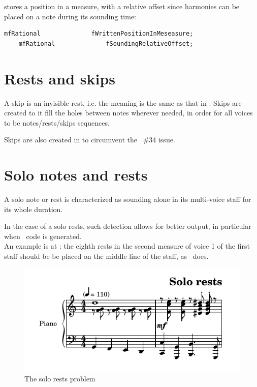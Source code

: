  stores a position in a measure, with a relative offset since harmonies can be placed on a note during its sounding time:
\begin{lstlisting}[language=CPlusPlus]
    mfRational              fWrittenPositionInMeseasure;
    mfRational              fSoundingRelativeOffset;
\end{lstlisting}


\section{Rests and skips}\label{Rests and skips}

A skip is an invisible rest, i.e. the meaning is the same as that in \lily. Skips are created to {it fill the holes} between notes wherever needed, in order for all voices to be notes/rests/skips sequences.

Skips are also created in \msrToLpsr{} to circumvent the \lily\ \#34 issue.


\section{Solo notes and rests}\label{Solo notes and rests}

A solo note or rest is characterized as sounding alone in its multi-voice staff for its whole duration.

In the case of a solo rests, such detection allows for better output, in particular when \lily\ code is generated.\\
An example is at  : the eighth rests in the second measure of voice 1 of the first staff should be be placed on the middle line of the staff, as \mscore\ does.
\begin{figure}[htbp]
\begin{center}
\includegraphics{../graphics/TheSoloRestsProblem.png}

\caption{The solo rests problem}
\label{The solo rests problem}
\end{center}
\end{figure}


